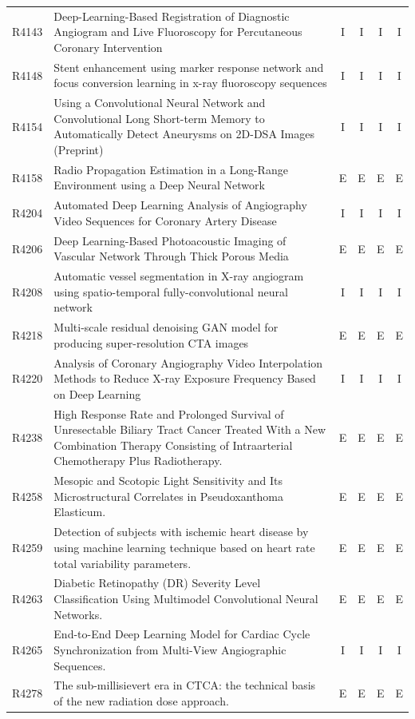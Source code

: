 \begin{longtable}{@{}l p{8.6cm} c c c c@{}}
R4143 & Deep-Learning-Based Registration of Diagnostic Angiogram and Live Fluoroscopy for Percutaneous Coronary Intervention & I & I & I & I \\
R4148 & Stent enhancement using marker response network and focus conversion learning in x-ray fluoroscopy sequences & I & I & I & I \\
R4154 & Using a Convolutional Neural Network and Convolutional Long Short-term Memory to Automatically Detect Aneurysms on 2D-DSA Images (Preprint) & I & I & I & I \\
R4158 & Radio Propagation Estimation in a Long-Range Environment using a Deep Neural Network & E & E & E & E \\
R4204 & Automated Deep Learning Analysis of Angiography Video Sequences for Coronary Artery Disease & I & I & I & I \\
R4206 & Deep Learning-Based Photoacoustic Imaging of Vascular Network Through Thick Porous Media & E & E & E & E \\
R4208 & Automatic vessel segmentation in X-ray angiogram using spatio-temporal fully-convolutional neural network & I & I & I & I \\
R4218 & Multi-scale residual denoising GAN model for producing super-resolution CTA images & E & E & E & E \\
R4220 & Analysis of Coronary Angiography Video Interpolation Methods to Reduce X-ray Exposure Frequency Based on Deep Learning & I & I & I & I \\
R4238 & High Response Rate and Prolonged Survival of Unresectable Biliary Tract Cancer Treated With a New Combination Therapy Consisting of Intraarterial Chemotherapy Plus Radiotherapy. & E & E & E & E \\
R4258 & Mesopic and Scotopic Light Sensitivity and Its Microstructural Correlates in Pseudoxanthoma Elasticum. & E & E & E & E \\
R4259 & Detection of subjects with ischemic heart disease by using machine learning technique based on heart rate total variability parameters. & E & E & E & E \\
R4263 & Diabetic Retinopathy (DR) Severity Level Classification Using Multimodel Convolutional Neural Networks. & E & E & E & E \\
R4265 & End-to-End Deep Learning Model for Cardiac Cycle Synchronization from Multi-View Angiographic Sequences. & I & I & I & I \\
R4278 & The sub-millisievert era in CTCA: the technical basis of the new radiation dose approach. & E & E & E & E \\

\end{longtable}

